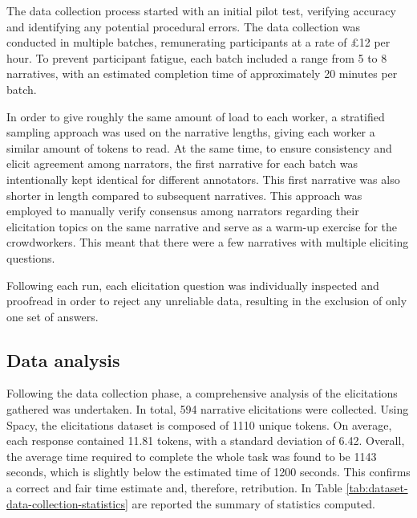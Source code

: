 The data collection process started with an initial pilot test, verifying accuracy and identifying any potential procedural errors. The data collection was conducted in multiple batches, remunerating participants at a rate of £12 per hour. To prevent participant fatigue, each batch included a range from 5 to 8 narratives, with an estimated completion time of approximately 20 minutes per batch.

In order to give roughly the same amount of load to each worker, a stratified sampling approach was used on the narrative lengths, giving each worker a similar amount of tokens to read. At the same time, to ensure consistency and elicit agreement among narrators, the first narrative for each batch was intentionally kept identical for different annotators. This first narrative was also shorter in length compared to subsequent narratives. This approach was employed to manually verify consensus among narrators regarding their elicitation topics on the same narrative and serve as a warm-up exercise for the crowdworkers. This meant that there were a few narratives with multiple eliciting questions.

Following each run, each elicitation question was individually inspected and proofread in order to reject any unreliable data, resulting in the exclusion of only one set of answers.


\subsection{Data analysis}
\label{cha:methodology-crowdsourcing-data-analysis}


Following the data collection phase, a comprehensive analysis of the elicitations gathered was undertaken. In total, 594 narrative elicitations were collected. Using Spacy, the elicitations dataset is composed of 1110 unique tokens. On average, each response contained 11.81 tokens, with a standard deviation of 6.42. Overall, the average time required to complete the whole task was found to be 1143 seconds, which is slightly below the estimated time of 1200 seconds. This confirms a correct and fair time estimate and, therefore, retribution. In Table \ref{tab:dataset-data-collection-statistics} are reported the summary of statistics computed. 

